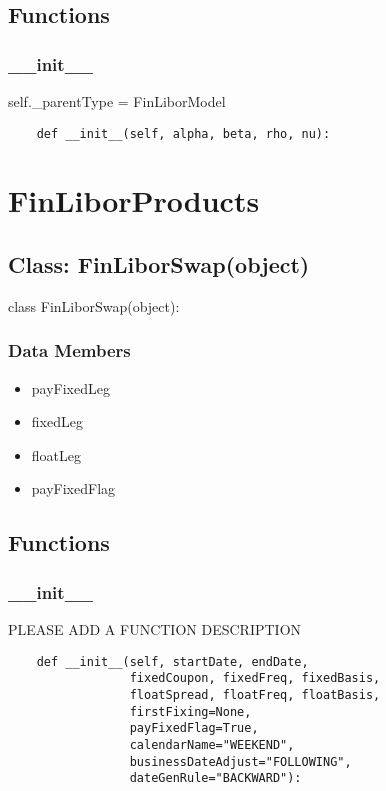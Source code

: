 \documentclass[twoside,11pt]{book}
\begin{document}
\subsection*{Functions}

\subsubsection*{{\bf \_\_init\_\_}}
self.\_parentType = FinLiborModel 

\begin{lstlisting}
    def __init__(self, alpha, beta, rho, nu):
\end{lstlisting}

\newpage
\section{FinLiborProducts}

\subsection*{Class: FinLiborSwap(object)}
class FinLiborSwap(object): 

\subsubsection*{Data Members}
\begin{itemize}
\item{payFixedLeg}
\item{fixedLeg}
\item{floatLeg}
\item{payFixedFlag}
\end{itemize}

\subsection*{Functions}

\subsubsection*{{\bf \_\_init\_\_}}
PLEASE ADD A FUNCTION DESCRIPTION

\begin{lstlisting}
    def __init__(self, startDate, endDate,
                 fixedCoupon, fixedFreq, fixedBasis,
                 floatSpread, floatFreq, floatBasis,
                 firstFixing=None,
                 payFixedFlag=True,
                 calendarName="WEEKEND",
                 businessDateAdjust="FOLLOWING",
                 dateGenRule="BACKWARD"):
\end{lstlisting}
\end{document}
